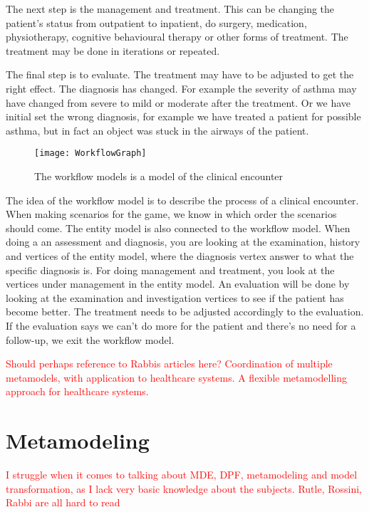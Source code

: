 The next step is the management and treatment. This can be changing the patient's status from outpatient to inpatient, do surgery, medication, physiotherapy, cognitive behavioural therapy or other forms of treatment. The treatment may be done in iterations or repeated.


The final step is to evaluate. The treatment may have to be adjusted to get the right effect. The diagnosis has changed. For example the severity of asthma may have changed from severe to mild or moderate after the treatment. Or we have initial set the wrong diagnosis, for example we have treated a patient for possible asthma, but in fact an object was stuck in the airways of the patient.


\begin{figure}[h!]
	\texttt{[image: WorkflowGraph]}
	\caption {The workflow models is a model of the clinical encounter}
		\label{fig:WorkflowGraph}
\end{figure}

The idea of the workflow model is to describe the process of a clinical encounter. When making scenarios for the game, we know in which order the scenarios should come. The entity model is also connected to the workflow model. When doing a an assessment and diagnosis, you are looking at the examination, history and vertices of the entity model, where the diagnosis vertex answer to what the specific diagnosis is. For doing management and treatment, you look at the vertices under management in the entity model. An evaluation will be done by looking at the examination and investigation vertices to see if the patient has become better. The treatment needs to be adjusted accordingly to the evaluation. If the evaluation says we can't do more for the patient and there's no need for a follow-up, we exit the workflow model.

\textcolor{red}{Should perhaps reference to Rabbis articles here? 
	Coordination	of multiple metamodels, with application	to healthcare systems.
A flexible metamodelling approach for healthcare systems. }

\section{Metamodeling}

\textcolor{red}{I struggle when it comes to talking about MDE, DPF, metamodeling and model transformation, as I lack very basic knowledge about the subjects. Rutle, Rossini, Rabbi are all hard to read}

